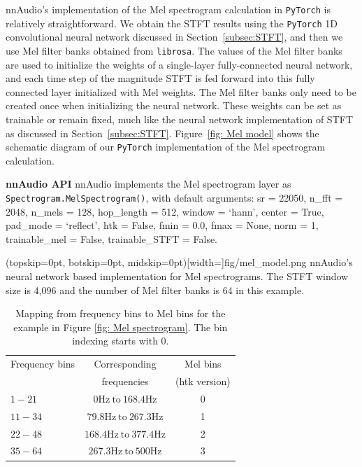 \documentclass{ieeeaccess}
\newcommand{\nbh}[1]{\texttt{#1}}
\begin{document}
nnAudio's implementation of the Mel spectrogram calculation in \nbh{PyTorch} is relatively straightforward. We obtain the STFT results using the \nbh{PyTorch} 1D convolutional neural network discussed in Section~\ref{subsec:STFT}, and then we use Mel filter banks obtained from \nbh{librosa}. The values of the Mel filter banks are used to initialize the weights of a single-layer fully-connected neural network, and each time step of the magnitude STFT is fed forward into this fully connected layer initialized with Mel weights.  The Mel filter banks only need to be created once when initializing the neural network. These weights can be set as trainable or remain fixed, much like the neural network implementation of STFT as discussed in Section~\ref{subsec:STFT}. Figure~\ref{fig: Mel model} shows the schematic diagram of our \nbh{PyTorch} implementation of the Mel spectrogram calculation.

\hspace{11pt} 

\noindent \textbf{nnAudio API} nnAudio implements the Mel spectrogram layer as \nbh{Spectrogram.MelSpectrogram()}, with default arguments: sr = 22050, n\_fft = 2048, n\_mels = 128, hop\_length = 512, window = `hann', center = True, pad\_mode = `reflect', htk = False, fmin = 0.0, fmax = None, norm = 1, trainable\_mel = False, trainable\_STFT = False.

\Figure[t](topskip=0pt, botskip=0pt, midskip=0pt)[width=\linewidth]{fig/mel_model.png}
{nnAudio's neural network based implementation for Mel spectrograms. The STFT window size is 4,096 and the number of Mel filter banks is 64 in this example.} \label{fig: Mel model}

\begin{table}\centering
\caption{Mapping from frequency bins to Mel bins for the example in Figure \ref{fig: Mel spectrogram}. The bin indexing starts with 0.}
\label{tab:mel}
\setlength{\tabcolsep}{3pt}
\begin{tabular}{lcc}
\toprule
Frequency bins& 
Corresponding & 
Mel bins\\
&frequencies& (htk version)\\
\midrule
$1-21$& $0\text{Hz} \ \text{to}\ 168.4$Hz & 0 \\
$11-34$& $79.8\text{Hz} \ \text{to}\ 267.3$Hz & 1 \\
$22-48$& $168.4\text{Hz} \ \text{to}\ 377.4$Hz & 2 \\
$35-64$& $267.3\text{Hz} \ \text{to}\ 500$Hz & 3 \\
\bottomrule
\end{tabular}
\label{tab1}
\end{table}
\end{document}
